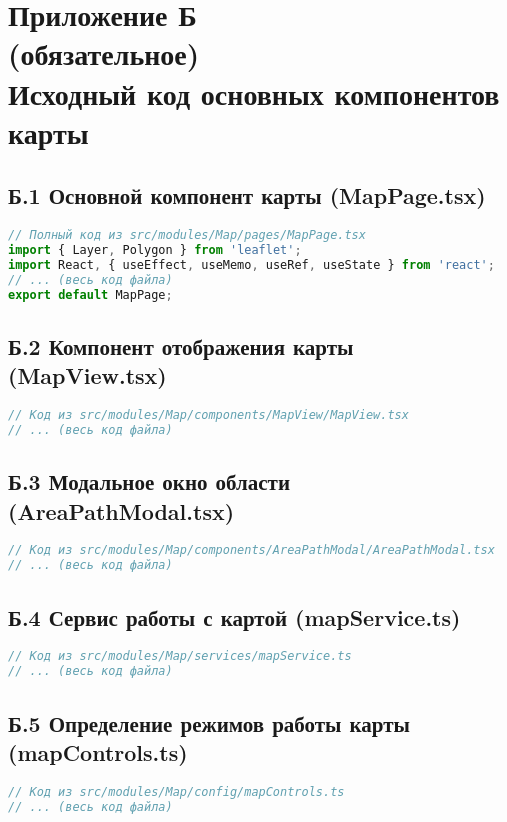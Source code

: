 \appendix
\section*{Приложение Б\\(обязательное)\\Исходный код основных компонентов карты}

\subsection*{Б.1 Основной компонент карты (MapPage.tsx)}
\begin{lstlisting}[language=TypeScript,caption=MapPage.tsx]
// Полный код из src/modules/Map/pages/MapPage.tsx
import { Layer, Polygon } from 'leaflet';
import React, { useEffect, useMemo, useRef, useState } from 'react';
// ... (весь код файла)
export default MapPage;
\end{lstlisting}

\subsection*{Б.2 Компонент отображения карты (MapView.tsx)}
\begin{lstlisting}[language=TypeScript,caption=MapView.tsx]
// Код из src/modules/Map/components/MapView/MapView.tsx
// ... (весь код файла)
\end{lstlisting}

\subsection*{Б.3 Модальное окно области (AreaPathModal.tsx)}
\begin{lstlisting}[language=TypeScript,caption=AreaPathModal.tsx]
// Код из src/modules/Map/components/AreaPathModal/AreaPathModal.tsx
// ... (весь код файла)
\end{lstlisting}

\subsection*{Б.4 Сервис работы с картой (mapService.ts)}
\begin{lstlisting}[language=TypeScript,caption=mapService.ts]
// Код из src/modules/Map/services/mapService.ts
// ... (весь код файла)
\end{lstlisting}

\subsection*{Б.5 Определение режимов работы карты (mapControls.ts)}
\begin{lstlisting}[language=TypeScript,caption=mapControls.ts]
// Код из src/modules/Map/config/mapControls.ts
// ... (весь код файла)
\end{lstlisting}


